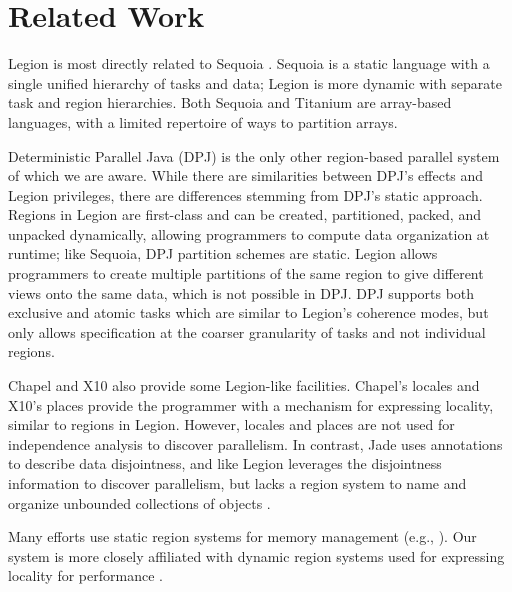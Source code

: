 
\section{Related Work}
\label{sec:related}
Legion is most directly related to Sequoia \cite{Fatahalian06}. 
Sequoia is a static language with a single unified hierarchy
of tasks and data; Legion is more dynamic with separate task and region hierarchies. 
Both Sequoia and Titanium\cite{TIT98} are array-based languages, with
a limited repertoire of ways to partition arrays.

Deterministic Parallel Java (DPJ) is the only other region-based parallel system of which we are
aware\cite{Bocchino09}.  While there are similarities between DPJ's effects and Legion privileges, 
there are differences stemming from DPJ's static approach.
Regions in Legion are first-class and can be created, partitioned, packed, and unpacked 
dynamically, allowing programmers to compute data organization at runtime; like Sequoia, DPJ
partition schemes are static.  Legion allows 
programmers to create multiple partitions of the same region to give different 
views onto the same data, which is not possible in DPJ.  DPJ supports both
exclusive and atomic tasks which are similar to Legion's coherence modes, but only
allows specification at the coarser granularity of tasks and not individual regions.

Chapel \cite{Chamberlain:Chapel} and X10 \cite{X1005} also provide some Legion-like facilities.
Chapel's locales and X10's places provide the programmer with a 
mechanism for expressing locality, similar to regions in Legion.  However, locales 
and places are not used for independence analysis to discover parallelism.
In contrast, Jade uses annotations to describe
data disjointness,  and like Legion leverages the disjointness information
to discover parallelism, but lacks a region system to name and organize unbounded collections of objects \cite{Rinard98}.  

Many efforts use static region systems for  memory management (e.g., \cite{Tofte94, Grossman02}).
Our system is more closely affiliated with dynamic region systems used for expressing locality for performance \cite{Gay01}.


